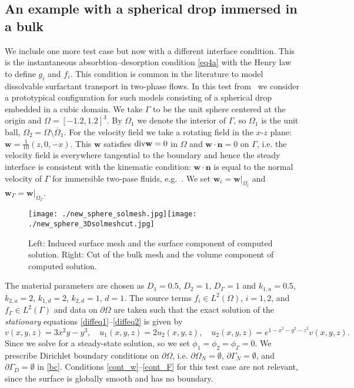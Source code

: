 \documentclass{article}
\newcommand{\bn}{\mathbf n}
\newcommand{\bw}{\mathbf w}
\newcommand{\Div}{\mbox{\rm div}}
\def\dO{{\partial\Omega} }
\begin{document}
{
\subsection{An example with a spherical drop immersed in a bulk}
We include one more test case but now with a different interface condition. This is
the instantaneous absorbtion--desorption condition \eqref{eq4a} with the Henry law to define $g_i$ and $f_i$.
This condition is common in the literature to model dissolvable surfactant transport in two-phase flows.
In this test from~\cite{gross2015trace} we consider a prototypical configuration for such models consisting of a spherical drop embedded in a cubic domain. We take $\Gamma$ to be the unit sphere centered at the origin and $\Omega = [-1.2,1.2]^3$.
By $\Omega_1$ we denote the interior of $\Gamma$, so $\Omega_1$ is the unit ball,  {$\Omega_2=\Omega\setminus\overline{\Omega}_1$}. For the velocity field we take a rotating field in the $x$-$z$ plane: $\bw=\frac{1}{10}(z,0,-x)$. This $\bw$ satisfies   $\Div\bw=0$ in $\Omega$ and $\bw \cdot \bn=0$ on $\Gamma$, i.e. the velocity field is everywhere tangential to the boundary and hence the steady interface is consistent with the kinematic condition: $\bw \cdot \bn$ is equal to the normal velocity of $\Gamma$ for immersible two-pase fluids, e.g.~\cite{GrossReuskenBook}. We set $\bw_i=\bw|_{\Omega_i}$ and $\bw_\Gamma=\bw|_{\Omega_\Gamma}$.

\begin{figure}[ht!]
\begin{center}
\texttt{[image: ./new\_sphere\_solmesh.jpg]}\qquad  \texttt{[image: ./new\_sphere\_3Dsolmeshcut.jpg]}
\caption{\label{fig:sphere_loc}
Left: Induced surface mesh and the surface component of computed solution.
Right: Cut of the bulk mesh and the volume component of computed solution.}
\end{center}
\end{figure}

The material parameters are chosen as $D_1=0.5$, $D_2=1$, $D_\Gamma=1$ and $k_{1,a}=0.5$, $k_{2,a}=2$, $k_{1,d}=2$, $k_{2,d}=1$, $d=1$.
The source terms $f_i\in L^2(\Omega)$, $i=1,2$, and $f_\Gamma\in L^2(\Gamma)$   and  data on $\dO$ are taken such  that the exact solution of the  \textit{stationary} equations \eqref{diffeq1}--\eqref{diffeq2} is given by
\begin{equation*} %
  v(x,y,z) = 3x^2y - y^3, \quad
  u_1(x,y,z) = 2 u_2(x,y,z), \quad
  u_2(x,y,z) = e^{1-x^2-y^2-z^2} v(x,y,z).
\end{equation*}
Since we solve for a steady-state solution, so we  set $\phi_1=\phi_2=\phi_\Gamma=0$.
 We prescribe Dirichlet boundary conditions on $\partial\Omega$, i.e. $\partial\Omega_N=\emptyset$,   $\partial\Gamma_N=\emptyset$, and $\partial\Gamma_D=\emptyset$ in \eqref{bc}. Conditions \eqref{cont_w}--\eqref{cont_F} for this test case are not relevant, since the surface is globally smooth and has no boundary.



}
\end{document}

